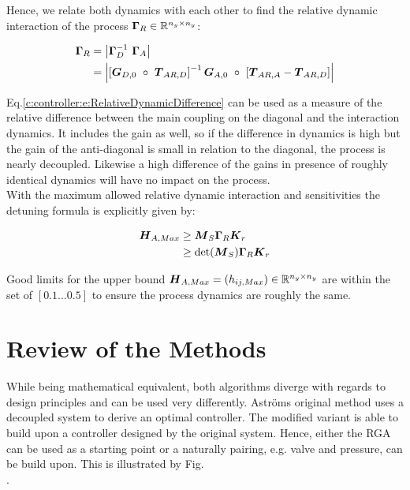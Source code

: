 Hence, we relate both dynamics with each other to find the relative dynamic interaction of the process $\mbox{\boldmath$\Gamma$}_R \in \mathbb{R}^{n_y \times n_y}$:

\begin{align}
\begin{split}
\mbox{\boldmath$\Gamma$}_R &= \left| \mbox{\boldmath$\Gamma$}_D^{-1}~\mbox{\boldmath$\Gamma$}_A  \right|\\
&= \left| \left[\mbox{\boldmath$G$}_{D,0}~\circ~\mbox{\boldmath$T$}_{AR,D}\right]^{-1} \mbox{\boldmath$G$}_{A,0}~\circ~\left[ \mbox{\boldmath$T$}_{AR,A} - \mbox{\boldmath$T$}_{AR,D}\right] \right|
\end{split}
\label{c:controller:e:RelativeDynamicDifference}
\end{align}

Eq.\ref{c:controller:e:RelativeDynamicDifference} can be used as a measure of the relative difference between the main coupling on the diagonal and the interaction dynamics. It includes the gain as well, so if the difference in dynamics is high but the gain of the anti-diagonal is small in relation to the diagonal, the process is nearly decoupled. Likewise a high difference of the gains in presence of roughly identical dynamics will have no impact on the process.\\

With the maximum allowed relative dynamic interaction and sensitivities the detuning formula is explicitly given by:

\begin{align}
\begin{split}
\mbox{\boldmath$H$}_{A,Max} &\geq \mbox{\boldmath$M$}_S \mbox{\boldmath$\Gamma$}_R \mbox{\boldmath$K$}_r \\ 
&\geq \det(\mbox{\boldmath$M$}_S) \mbox{\boldmath$\Gamma$}_R \mbox{\boldmath$K$}_r 
\end{split}
\end{align}

Good limits for the upper bound $\mbox{\boldmath$H$}_{A,Max} = \left( h_{ij,Max}\right) \in \mathbb{R}^{n_y \times n_y}$ are within the set of $\left[0.1 \dots 0.5 \right]$ to ensure the process dynamics are roughly the same.

\section{Review of the Methods}\label{c:controller:s:review}

While being mathematical equivalent, both algorithms diverge with regards to design principles and can be used very differently. Astr\"oms original method uses a decoupled system to derive an optimal controller. The modified variant is able to build upon a controller designed by the original system. Hence, either the RGA can be used as a starting point or a naturally pairing, e.g. valve and pressure, can be build upon. This is illustrated by Fig. \\.


